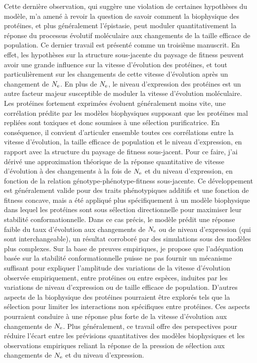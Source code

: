 Cette dernière observation, qui suggère une violation de certaines hypothèses du modèle, m'a amené à revoir la question de savoir comment la biophysique des protéines, et plus généralement l'épistasie, peut moduler quantitativement la réponse du processus évolutif moléculaire aux changements de la taille efficace de population.
Ce dernier travail est présenté comme un troisième manuscrit.
En effet, les hypothèses sur la structure sous-jacente du paysage de fitness peuvent avoir une grande influence sur la vitesse d'évolution des protéines, et tout particulièrement sur les changements de cette vitesse d'évolution après un changement de $N_{\text{e}}$.
En plus de $N_{\text{e}}$, le niveau d'expression des protéines est un autre facteur majeur susceptible de moduler la vitesse d'évolution moléculaire.
Les protéines fortement exprimées évoluent généralement moins vite, une corrélation prédite par les modèles biophysiques supposant que les protéines mal repliées sont toxiques et donc soumises à une sélection purificatrice.
En conséquence, il convient d'articuler ensemble toutes ces corrélations entre la vitesse d'évolution, la taille efficace de population et le niveau d'expression, en rapport avec la structure du paysage de fitness sous-jacent.
Pour ce faire, j'ai dérivé une approximation théorique de la réponse quantitative de vitesse d'évolution à des changements à la fois de $N_{\text{e}}$ et du niveau d'expression, en fonction de la relation génotype-phénotype-fitness sous-jacente.
Ce développement est généralement valide pour des traits phénotypiques additifs et une fonction de fitness concave, mais a été appliqué plus spécifiquement à un modèle biophysique dans lequel les protéines sont sous sélection directionnelle pour maximiser leur stabilité conformationnelle.
Dans ce cas précis, le modèle prédit une réponse faible du taux d'évolution aux changements de $N_{\text{e}}$ ou de niveau d'expression (qui sont interchangeable), un résultat corroboré par des simulations sous des modèles plus complexes.
Sur la base de preuves empiriques, je propose que l'adéquation basée sur la stabilité conformationnelle puisse ne pas fournir un mécanisme suffisant pour expliquer l'amplitude des variations de la vitesse d'évolution observée empiriquement, entre protéines ou entre espèces, induites par les variations de niveau d'expression ou de taille efficace de population.
D'autres aspects de la biophysique des protéines pourraient être explorés tels que la sélection pour limiter les interactions non spécifiques entre protéines.
Ces aspects pourraient conduire à une réponse plus forte de la vitesse d'évolution aux changements de $N_{\text{e}}$.
Plus généralement, ce travail offre des perspectives pour réduire l'écart entre les prévisions quantitatives des modèles biophysiques et les observations empiriques reliant la réponse de la pression de sélection aux changements de $N_{\text{e}}$ et du niveau d'expression.

